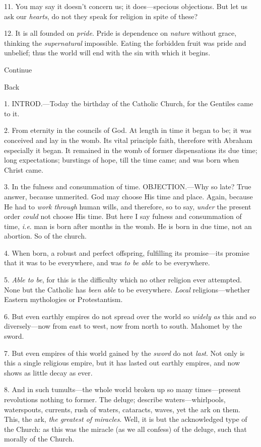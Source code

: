 11. You may say it doesn't concern us; it
does—specious objections. But let us ask our \emph{hearts}, do not
they speak for religion in spite of these?

12. It is all founded on \emph{pride}. Pride is
dependence on \emph{nature} without grace, thinking the \emph{supernatural}
impossible. Eating the forbidden fruit was pride and unbelief; thus
the world will end with the sin with which it begins.

Continue

Back


1. INTROD.—Today
the birthday of the Catholic Church, for the Gentiles came to it.

2. From eternity in the councils of God. At
length in time it began to be; it was conceived and lay in the womb.
Its vital principle faith, therefore with Abraham especially it began.
It remained in the womb of former dispensations its due time; long
expectations; burstings of hope, till the time came; and was born when
Christ came.

3. In the fulness and consummation of time. OBJECTION.—Why
so late? True answer, because unmerited. God may choose His time and
place. Again, because He had to \emph{work through} human wills, and
therefore, so to say, \emph{under} the present order \emph{could} not
choose His time. But here I say fulness and consummation of time, \emph{i.e}.
man is born after months in the womb. He is born in due time, not an
abortion. So of the church.

4. When born, a robust and perfect offspring,
fulfilling its promise—its promise that it was to be everywhere, and
was \emph{to be able} to be everywhere.

5. \emph{Able to be}, for this is the difficulty
which no other religion ever attempted. None but the Catholic has \emph{been
able} to be everywhere. \emph{Local} religions—whether
Eastern mythologies or Protestantism.

6. But even earthly empires do not spread over
the world so \emph{widely} \emph{as} this and so diversely—now from
east to west, now from north to south. Mahomet by the sword.

7. But even empires of this world gained by the \emph{sword}
do not \emph{last}. Not only is this a single religious empire, but it
has lasted out earthly empires, and now shows as little decay as ever.

8. And in such tumults—the whole world broken
up so many times—present revolutions nothing to former. The deluge;
describe waters—whirlpools, waterspouts, currents, rush of waters,
cataracts, waves, yet the ark on them. This, the ark, \emph{the greatest
of miracles}. Well, it is but the acknowledged type of the Church:
as this was the miracle (as we all confess) of the deluge, such that
morally of the Church.


